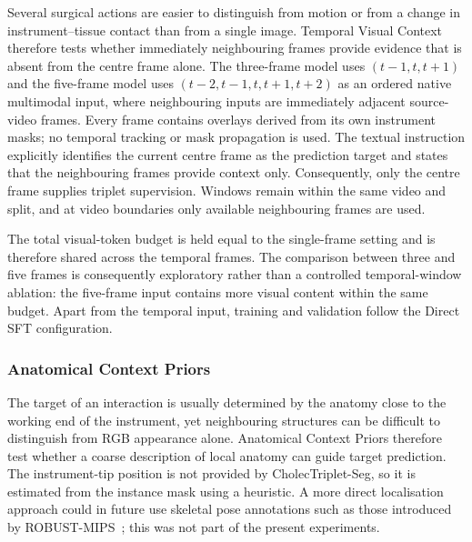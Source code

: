 Several surgical actions are easier to distinguish from motion or from a change in instrument--tissue contact than from a single image. Temporal Visual Context therefore tests whether immediately neighbouring frames provide evidence that is absent from the centre frame alone. The three-frame model uses $(t-1,t,t+1)$ and the five-frame model uses $(t-2,t-1,t,t+1,t+2)$ as an ordered native multimodal input, where neighbouring inputs are immediately adjacent source-video frames. Every frame contains overlays derived from its own instrument masks; no temporal tracking or mask propagation is used. The textual instruction explicitly identifies the current centre frame as the prediction target and states that the neighbouring frames provide context only. Consequently, only the centre frame supplies triplet supervision. Windows remain within the same video and split, and at video boundaries only available neighbouring frames are used.

The total visual-token budget is held equal to the single-frame setting and is therefore shared across the temporal frames. The comparison between three and five frames is consequently exploratory rather than a controlled temporal-window ablation: the five-frame input contains more visual content within the same budget. Apart from the temporal input, training and validation follow the Direct SFT configuration.

\subsubsection{Anatomical Context Priors}

The target of an interaction is usually determined by the anatomy close to the working end of the instrument, yet neighbouring structures can be difficult to distinguish from RGB appearance alone. Anatomical Context Priors therefore test whether a coarse description of local anatomy can guide target prediction. The instrument-tip position is not provided by CholecTriplet-Seg, so it is estimated from the instance mask using a heuristic. A more direct localisation approach could in future use skeletal pose annotations such as those introduced by ROBUST-MIPS~\cite{han2025robust}; this was not part of the present experiments.

